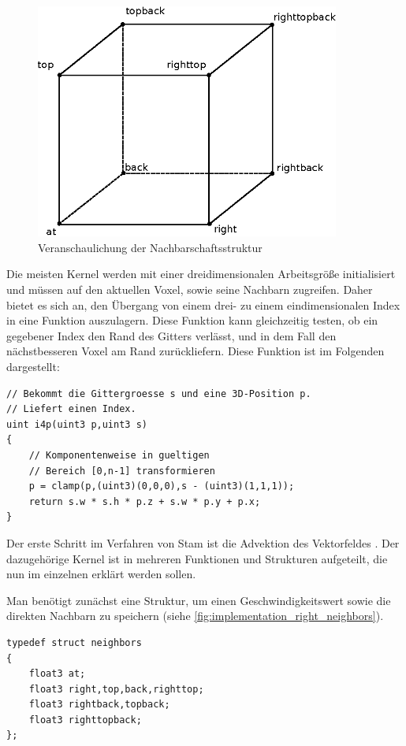 \begin{figure}[ht]
\centering
\includegraphics[width=10cm]{images/right_neighborhood}
\caption{Veranschaulichung der Nachbarschaftsstruktur }
\label{fig:implementation_right_neighbors}
\end{figure}

Die meisten Kernel werden mit einer dreidimensionalen Arbeitsgröße initialisiert
und müssen auf den aktuellen Voxel, sowie seine Nachbarn zugreifen. Daher bietet
es sich an, den Übergang von einem drei- zu einem eindimensionalen Index in eine
Funktion auszulagern. Diese Funktion kann gleichzeitig testen, ob ein gegebener
Index den Rand des Gitters verlässt, und in dem Fall den nächstbesseren Voxel am
Rand zurückliefern. Diese Funktion  ist im Folgenden
dargestellt:

\begin{verbatim}
// Bekommt die Gittergroesse s und eine 3D-Position p.
// Liefert einen Index.
uint i4p(uint3 p,uint3 s)
{
    // Komponentenweise in gueltigen
    // Bereich [0,n-1] transformieren
    p = clamp(p,(uint3)(0,0,0),s - (uint3)(1,1,1));
    return s.w * s.h * p.z + s.w * p.y + p.x;
}
\end{verbatim}

Der erste Schritt im Verfahren von Stam ist die Advektion des Vektorfeldes
. Der dazugehörige Kernel ist in mehreren Funktionen
und Strukturen aufgeteilt, die nun im einzelnen erklärt werden sollen.

Man benötigt zunächst eine Struktur, um einen Geschwindigkeitswert sowie die direkten
Nachbarn zu speichern (siehe \autoref{fig:implementation_right_neighbors}).

\begin{verbatim}
typedef struct neighbors
{
    float3 at;
    float3 right,top,back,righttop;
    float3 rightback,topback;
    float3 righttopback;
};
\end{verbatim}

